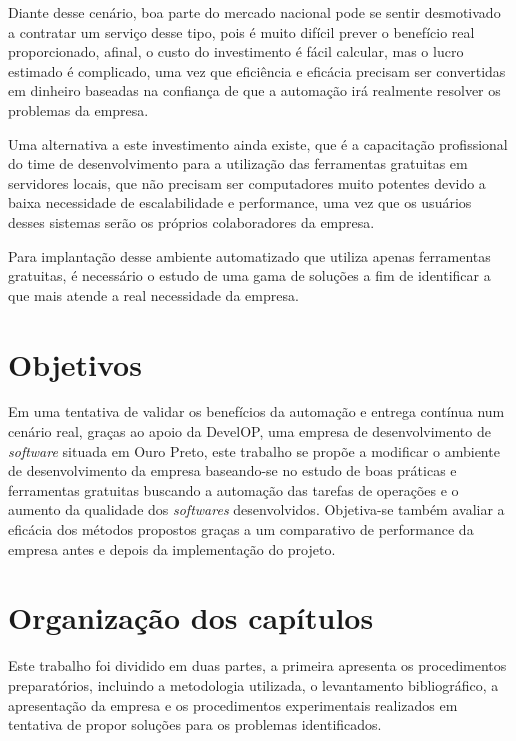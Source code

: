 \documentclass[
	12pt,				%
	openright,			%
	oneside,			%
	a4paper,			%
	english,			%
	french,				%
	spanish,			%
	brazil,				%
	]{abntex2}
\begin{document}
Diante desse cenário, boa parte do mercado nacional pode se sentir desmotivado a contratar um serviço desse tipo, pois é muito difícil prever o benefício real proporcionado, afinal, o custo do investimento é fácil calcular, mas o lucro estimado é complicado, uma vez que eficiência e eficácia precisam ser convertidas em dinheiro baseadas na confiança de que a automação irá realmente resolver os problemas da empresa.

Uma alternativa a este investimento ainda existe, que é a capacitação profissional do time de desenvolvimento para a utilização das ferramentas gratuitas em servidores locais, que não precisam ser computadores muito potentes devido a baixa necessidade de escalabilidade e performance, uma vez que os usuários desses sistemas serão os próprios colaboradores da empresa.

Para implantação desse ambiente automatizado que utiliza apenas ferramentas gratuitas, é necessário o estudo de uma gama de soluções a fim de identificar a que mais atende a real necessidade da empresa.

\section{Objetivos}

Em uma tentativa de validar os benefícios da automação e entrega contínua num cenário real, graças ao apoio da DevelOP, uma empresa de desenvolvimento de \textit{software} situada em Ouro Preto, este trabalho se propõe a modificar o ambiente de desenvolvimento da empresa baseando-se no estudo de boas práticas e ferramentas gratuitas buscando a automação das tarefas de operações e o aumento da qualidade dos \textit{softwares} desenvolvidos. Objetiva-se também avaliar a eficácia dos métodos propostos graças a um comparativo de performance da empresa antes e depois da implementação do projeto.

\section{Organização dos capítulos}

Este trabalho foi dividido em duas partes, a primeira apresenta os procedimentos preparatórios, incluindo a metodologia utilizada, o levantamento bibliográfico, a apresentação da empresa e os procedimentos experimentais realizados em tentativa de propor soluções para os problemas identificados.
\end{document}
